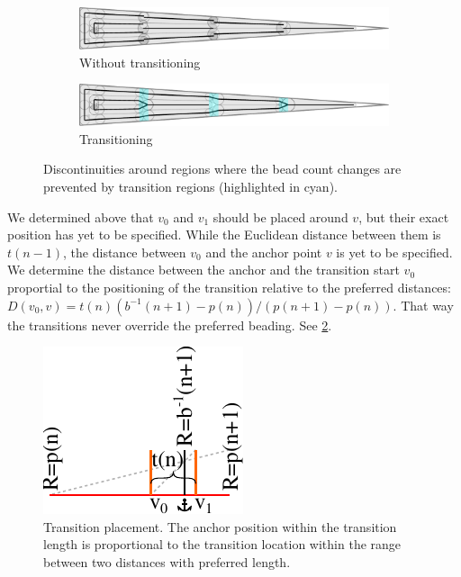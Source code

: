 \begin{figure}
\centering
\begin{subfigure}{0.9\textwidth}
\includegraphics[width=\columnwidth]{sources/method/wedge_distributed_generated__no_transitions.pdf}
\caption{Without transitioning}
\end{subfigure}
\begin{subfigure}{0.9\textwidth}
\includegraphics[width=\columnwidth]{sources/method/wedge_distributed_generated.pdf}
\caption{Transitioning}
\end{subfigure}
\caption{
Discontinuities around regions where the bead count changes are prevented by transition regions (highlighted in cyan).
}
\label{transitions}
\end{figure}

We determined above that $v_0$ and $v_1$ should be placed around $v$, but their exact position has yet to be specified.
While the Euclidean distance between them is $t(n-1)$, the distance between $v_0$ and the anchor point $v$ is yet to be specified.
We determine the distance between the anchor and the transition start $v_0$ proportial to the positioning of the transition relative to the preferred distances: $D(v_0, v) =  t(n) (b^{-1}(n+1) - p(n) ) / (p(n+1) - p(n))$.
That way the transitions never override the preferred beading.
See \cref{transition_placement}.


\begin{figure}
\centering
\includegraphics[width=.3\columnwidth]{sources/method/transition_location_precise.pdf}
\caption{
Transition placement.
The anchor position within the transition length is proportional to the transition location within the range between two distances with preferred length. 
}
\label{transition_placement}
\end{figure}


